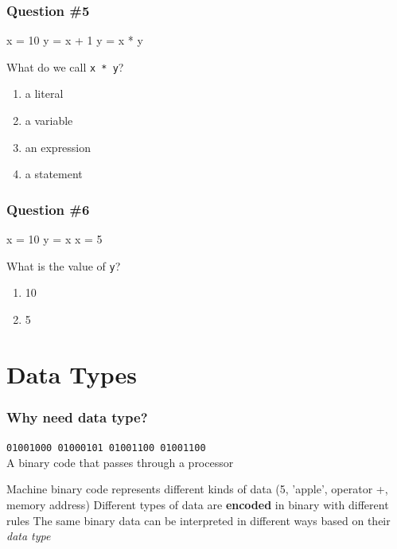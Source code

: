 \documentclass[11pt]{beamer}
\begin{document}
\begin{frame}[fragile]
  \frametitle{Question \#5}
  \Enlarge

  \begin{semiverbatim}
x = 10
y = x + 1
y = x * y
  \end{semiverbatim}
  What do we call \texttt{x * y}?
  \begin{enumerate}[label=\Alph*]
  \item  a literal
  \item  a variable
  \item  an expression
  \item  a statement
  \end{enumerate}
\end{frame}

\begin{frame}[fragile]
  \frametitle{Question \#6}
  \Enlarge

  \begin{semiverbatim}
x = 10
y = x
x = 5
  \end{semiverbatim}
  What is the value of \texttt{y}?
  \begin{enumerate}[label=\Alph*]
  \item  10
  \item  5
  \end{enumerate}
\end{frame}

\section{Data Types}

\begin{frame}
  \frametitle{Why need data type?}
  \Enlarge

  \texttt{01001000 01000101 01001100 01001100} \\
  A binary code that passes through a processor
  \begin{itemize}
  \myitem  Machine binary code represents different kinds of data (5, 'apple', operator +, memory address) \pause
  \myitem  Different types of data are {\bf encoded} in binary with different rules \pause
  \myitem  The same binary data can be interpreted in different ways based on their \emph{data type}
  \end{itemize}
\end{frame}
\end{document}
